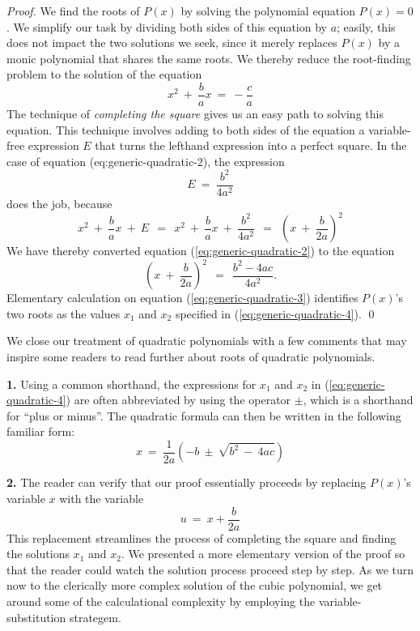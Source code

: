 \begin{proof}
We find the roots of $P(x)$ by solving the polynomial equation $P(x) =
0$.  We simplify our task by dividing both sides of this equation by
$a$; easily, this does not impact the two solutions we seek, since it
merely replaces $P(x)$ by a monic polynomial that shares the same
roots.  We thereby reduce the root-finding problem to the solution of
the equation
\begin{equation}
\label{eq:generic-quadratic-2}
x^2 \ + \ \frac{b}{a} x \ = \ - \frac{c}{a}
\end{equation}
The technique of {\it completing the square}
 gives us an easy
path to solving this equation.  This technique involves adding to both
sides of the equation a variable-free expression $E$ that turns the
lefthand expression into a perfect square.  In the case of equation
({eq:generic-quadratic-2}), the expression
\[ E \ = \ \frac{b^2}{4a^2} \]
does the job, because
\[
x^2 \ + \ \frac{b}{a} x \ + \ E \ \ = \ \
x^2 \ + \ \frac{b}{a} x \ + \ \frac{b^2}{4a^2}
   \ \ = \ \ \left( x \ + \ \frac{b}{2a} \right)^2
\]
We have thereby converted equation (\ref{eq:generic-quadratic-2}) to
the equation
\begin{equation}
\label{eq:generic-quadratic-3}
\left( x \ + \ \frac{b}{2a} \right)^2
 \ \ = \ \ \frac{b^2 - 4ac}{4a^2}.
\end{equation}
Elementary calculation on equation (\ref{eq:generic-quadratic-3})
identifies $P(x)$'s two roots as the values $x_1$ and $x_2$ specified
in (\ref{eq:generic-quadratic-4}).  \qed
\end{proof}

\bigskip

\noindent
We close our treatment of quadratic polynomials with a few comments
that may inspire some readers to read further about roots of quadratic
polynomials.

{\bf 1.}
Using a common shorthand, the expressions for $x_1$ and $x_2$ in
(\ref{eq:generic-quadratic-4}) are often abbreviated by using the
operator $\pm$, which is a shorthand for ``plus or minus''.
 The quadratic formula can then be written
in the following familiar form:
\[
x \ = \  \frac{1}{2a} \left( -b \ \pm \ \sqrt{b^2 \ - \ 4ac} \right)
\]

\smallskip

{\bf 2.}
The reader can verify that our proof essentially proceeds by
replacing $P(x)$'s variable $x$ with the variable
\[ u \ = \ x + \frac{b}{2a} \]
This replacement streamlines the process of completing the square and
finding the solutions $x_1$ and $x_2$.  We presented a more elementary
version of the proof so that the reader could watch the solution
process proceed step by step.  As we turn now to the clerically more
complex solution of the cubic polynomial, we get around some of the
calculational complexity by employing the variable-substitution
strategem.

